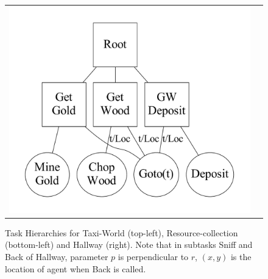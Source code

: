\documentclass[11pt]{article} %
\begin{document}
\begin{figure}[ht]
\begin{tabular}{cc}
 \includegraphics[scale=0.27]{task/Wargus-Hierarchy.pdf} & \\
 \end{tabular}
 \caption{Task Hierarchies for {\sf Taxi-World} (top-left), {\sf Resource-collection} (bottom-left) and {\sf Hallway} (right). Note that in subtasks Sniff and Back of Hallway, parameter $p$ is perpendicular to $r$, $(x, y)$ is the location of agent when Back is called.}\label{fig:tasks}
 \end{figure}

\end{document}
